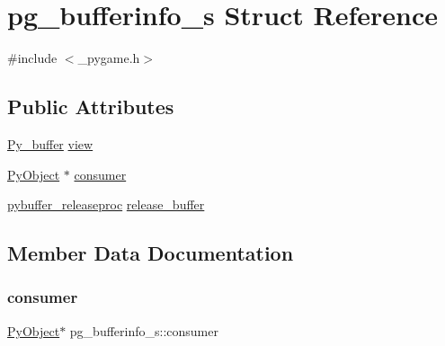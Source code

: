 \hypertarget{structpg__bufferinfo__s}{}\section{pg\+\_\+bufferinfo\+\_\+s Struct Reference}
\label{structpg__bufferinfo__s}


{\ttfamily \#include $<$\+\_\+pygame.\+h$>$}

\subsection*{Public Attributes}
\begin{DoxyCompactItemize}
\item 
\mbox{\hyperlink{_python27_2object_8h_a0c1c5dc66cfb07c46b863b5186f61cf4}{Py\+\_\+buffer}} \mbox{\hyperlink{structpg__bufferinfo__s_adb572aee8152d8eb6f08c9ed2ffe465c}{view}}
\item 
\mbox{\hyperlink{_python27_2object_8h_aadc84ac7aed2cfa6f20c25f62bf3dac7}{Py\+Object}} $\ast$ \mbox{\hyperlink{structpg__bufferinfo__s_a025991b5e6a456804b14c74327ceb557}{consumer}}
\item 
\mbox{\hyperlink{__pygame_8h_ad02fd84ceaf918398aa37e358cd2cc3f}{pybuffer\+\_\+releaseproc}} \mbox{\hyperlink{structpg__bufferinfo__s_ad3532176c7543016ba62b6fcfbed5ea9}{release\+\_\+buffer}}
\end{DoxyCompactItemize}


\subsection{Member Data Documentation}
\mbox{\label{structpg__bufferinfo__s_a025991b5e6a456804b14c74327ceb557}} 
\subsubsection{\texorpdfstring{consumer}{consumer}}
{\footnotesize\ttfamily \mbox{\hyperlink{_python27_2object_8h_aadc84ac7aed2cfa6f20c25f62bf3dac7}{Py\+Object}}$\ast$ pg\+\_\+bufferinfo\+\_\+s\+::consumer}

\mbox{\label{structpg__bufferinfo__s_ad3532176c7543016ba62b6fcfbed5ea9}} 
